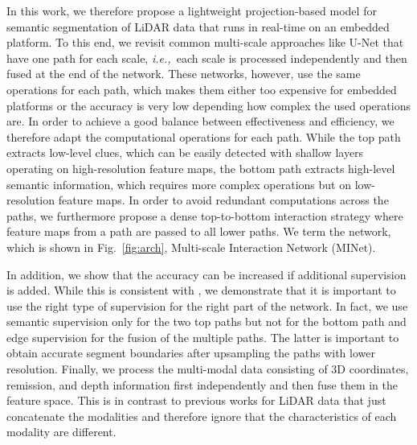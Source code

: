 \documentclass[letterpaper, 10 pt, journal, twoside]{ieeetran}
\newcommand{\figref}[1]{Fig.~\ref{#1}}
\def\ie{\textit{i.e.,~}}
\newcommand{\todo}[1]{#1}
\begin{document}
In this work, we therefore propose a lightweight projection-based model for semantic segmentation of LiDAR data that runs in real-time on an embedded platform. To this end, we revisit common multi-scale approaches like U-Net \cite{ronneberger2015u} that have one path for each scale\todo{, \ie each scale is processed independently and then fused at the end of the network.} 
These networks, however, use the same operations for each path, which makes them either too expensive for embedded platforms or the accuracy is very low depending how complex the used operations are. In order to achieve a good balance between effectiveness and efficiency, we therefore adapt the computational operations for each path.
While the top path extracts low-level clues, which can be easily detected with shallow layers operating on high-resolution feature maps, the bottom path extracts high-level semantic information, which requires more complex operations but on low-resolution feature maps. In order to avoid redundant computations across the paths, we furthermore propose a dense top-to-bottom interaction strategy where feature maps from a path are passed to all lower paths. We term the network, which is shown in \figref{fig:arch}, Multi-scale Interaction Network (MINet). 

In addition, we show that the accuracy can be increased if additional supervision is added. While this is consistent with \cite{zhao2017pyramid,zhang2018context,liu2019richer,liu2018semantic}, we demonstrate that it is important to use the right type of supervision for the right part of the network. In fact, we use semantic supervision only for the two top paths but not for the bottom path and edge supervision for the fusion of the multiple paths. The latter is important to obtain accurate segment boundaries after upsampling the paths with lower resolution.
Finally, we process the multi-modal data consisting of 3D coordinates, remission, and depth information first independently and then fuse them in the feature space. This is in contrast to previous works for LiDAR data that just concatenate the modalities and therefore ignore that the characteristics of each modality are different. 
\end{document}
